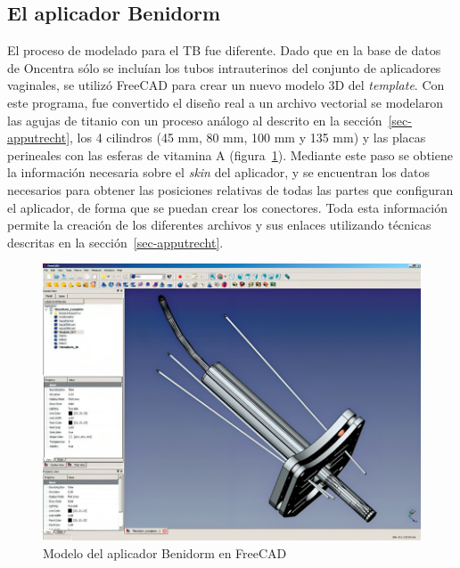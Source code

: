 \documentclass[
  a4paper,
]{scrreprt}
\begin{document}
\hypertarget{sec-templatebenidorm}{%
\subsection{El aplicador Benidorm}\label{sec-templatebenidorm}}

El proceso de modelado para el TB fue diferente. Dado que en la base de
datos de Oncentra sólo se incluían los tubos intrauterinos del conjunto
de aplicadores vaginales, se utilizó FreeCAD para crear un nuevo modelo
3D del \emph{template}. Con este programa, fue convertido el diseño real
a un archivo vectorial se modelaron las agujas de titanio con un proceso
análogo al descrito en la sección~\ref{sec-apputrecht}, los 4 cilindros
(45 mm, 80 mm, 100 mm y 135 mm) y las placas perineales con las esferas
de vitamina A (figura~\ref{fig-tbfreecad}). Mediante este paso se
obtiene la información necesaria sobre el \emph{skin} del aplicador, y
se encuentran los datos necesarios para obtener las posiciones relativas
de todas las partes que configuran el aplicador, de forma que se puedan
crear los conectores. Toda esta información permite la creación de los
diferentes archivos y sus enlaces utilizando técnicas descritas en la
sección~\ref{sec-apputrecht}.

\begin{figure}

{\centering \includegraphics{img/TB_freecad.png}

}

\caption{\label{fig-tbfreecad}Modelo del aplicador Benidorm en FreeCAD}

\end{figure}
\end{document}
